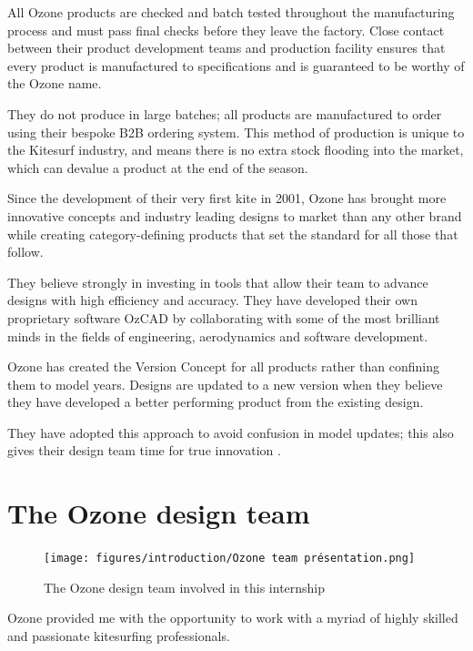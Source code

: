 All Ozone products are checked and batch tested throughout the manufacturing process and must pass final checks before they leave the factory. Close contact between their product development teams and production facility ensures that every product is manufactured to specifications and is guaranteed to be worthy of the Ozone name.

They do not produce in large batches; all products are manufactured to order using their bespoke B2B ordering system. This method of production is unique to the Kitesurf industry, and means there is no extra stock flooding into the market, which can devalue a product at the end of the season.

Since the development of their very first kite in 2001, Ozone has brought more innovative concepts and industry leading designs to market than any other brand while creating category-defining products that set the standard for all those that follow.

They believe strongly in investing in tools that allow their team to advance designs with high efficiency and accuracy. They have developed their own proprietary software OzCAD by collaborating with some of the most brilliant minds in the fields of engineering, aerodynamics and software development.

Ozone has created the Version Concept for all products rather than confining them to model years. Designs are updated to a new version when they believe they have developed a better performing product from the existing design.

They have adopted this approach to avoid confusion in model updates; this also gives their design team time for true innovation \cite{ozonekites}.


\section{The Ozone design team}
\label{sec:In1.2}

\begin{figure}[H]
    \centering
    \texttt{[image: figures/introduction/Ozone team présentation.png]}
    \caption{The Ozone design team involved in this internship}
    \label{fig:The Ozone design team}
\end{figure}

Ozone provided me with the opportunity to work with a myriad of highly skilled and passionate kitesurfing professionals.

